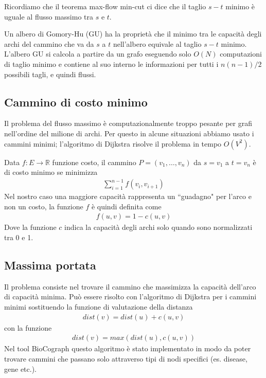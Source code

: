 \documentclass[12pt]{report}
\newcommand{\quotes}[1]{``#1"}
\begin{document}
Ricordiamo che il teorema max-flow min-cut ci dice che il taglio $s-t$ minimo è uguale al flusso massimo tra $s$ e $t$. 

Un albero di Gomory-Hu (GU) ha la proprietà che il minimo tra le capacità degli archi del cammino che va da $s$ a $t$ nell'albero equivale al taglio $s-t$ minimo. L'albero GU si calcola a partire da un grafo eseguendo solo $O(N)$ computazioni di taglio minimo e contiene al suo interno le informazioni per tutti i $n(n-1)/2$ possibili tagli, e quindi flussi.

\subsection{Cammino di costo minimo}
Il problema del flusso massimo è computazionalmente troppo pesante per grafi nell'ordine del milione di archi. Per questo in alcune situazioni abbiamo usato i cammini minimi; l'algoritmo di Dijkstra risolve il problema in tempo $O(V^2)$.

Data $f: E \rightarrow \mathbb{R}$ funzione costo, il cammino  $P = (v_1, \dots, v_n)$ da $s = v_1$ a $t = v_n$ è di costo minimo se minimizza
\begin{gather}
    \sum_{i=1}^{n-1}f(v_i, v_{i+1})
\end{gather}
Nel nostro caso una maggiore capacità rappresenta un \quotes{guadagno} per l'arco e non un costo, la funzione $f$ è quindi definita come
\begin{gather}
    f(u,v) = 1 - c(u,v)
\end{gather}
Dove la funzione $c$ indica la capacità degli archi solo quando sono normalizzati tra 0 e 1.

\subsection{Massima portata}
Il problema consiste nel trovare il cammino che massimizza la capacità dell'arco di capacità minima. Può essere risolto con l'algoritmo di Dijkstra per i cammini minimi sostituendo la funzione di valutazione della distanza
\begin{gather}
    dist(v)  = dist(u) + c(u,v)
\end{gather}
con la funzione \cite{bottleneck}
\begin{gather}
    dist(v)  = max (dist(u), c(u,v))
\end{gather}
Nel tool BioCograph questo algoritmo è stato implementato in modo da poter trovare cammini che passano solo attraverso tipi di nodi specifici (es. disease, gene etc.).
\end{document}
